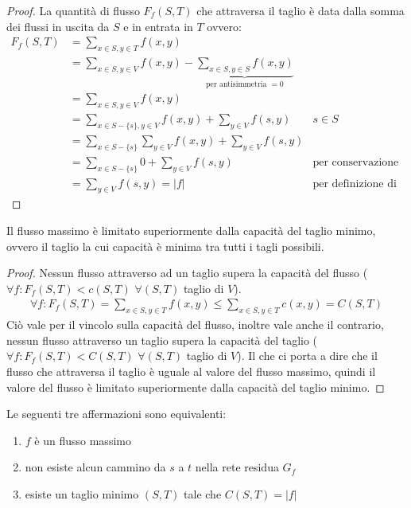         \begin{proof}
            La quantità di flusso $F_f(S,T)$ che attraversa il taglio è data dalla somma dei flussi in uscita da $S$ e in entrata in $T$ ovvero:
            \begin{align*}
                F_f(S,T) &= \sum_{x\in S,y\in T} f(x,y) \\
                &= \sum_{x\in S,y\in V} f(x,y) - \underbrace{\sum_{x\in S,y\in S} f(x,y)}_{\text{per antisimmetria }= 0} \\
                &= \sum_{x\in S,y\in V} f(x,y)\\
                &= \sum_{x\in S-\{s\},y\in V} f(x,y) + \sum_{y\in V} f(s,y) & s\in S \\
                &= \sum_{x\in S-\{s\}}\sum_{y\in V} f(x,y) + \sum_{y\in V} f(s,y) \\
                &= \sum_{x\in S-\{s\}} 0 + \sum_{y\in V} f(s,y) & \text{per conservazione } \\
                &= \sum_{y\in V} f(s,y) = |f| & \text{per definizione di flusso}
            \end{align*}
        \end{proof}
        \begin{theorem}
            Il flusso massimo è limitato superiormente dalla capacità del taglio minimo, ovvero il taglio la cui capacità è minima tra tutti i tagli possibili.
        \end{theorem}
        \begin{proof}
            Nessun flusso attraverso ad un taglio supera la capacità del flusso ($\forall f:F_f(S,T) < c(S,T)$ $\forall (S,T)$ taglio di $V$).
            \begin{align*}
                \forall f:F_f(S,T) = \sum_{x\in S,y\in T} f(x,y) \leq \sum_{x\in S,y\in T} c(x,y) = C(S,T) 
            \end{align*}
            Ciò vale per il vincolo sulla capacità del flusso, inoltre vale anche il contrario, nessun flusso attraverso un taglio supera la capacità del taglio ($\forall f:F_f(S,T) < C(S,T)$ $\forall (S,T)$ taglio di $V$). Il che ci porta a dire che il flusso che attraversa il taglio è uguale al valore del flusso massimo, quindi il valore del flusso è limitato superiormente dalla capacità del taglio minimo.
        \end{proof}
        \begin{theorem}
            Le seguenti tre affermazioni sono equivalenti:
            \begin{enumerate}
                \item $f$ è un flusso massimo
                \item non esiste alcun cammino da $s$ a $t$ nella rete residua $G_f$
                \item esiste un taglio minimo $(S,T)$ tale che $C(S,T) = |f|$
            \end{enumerate}
        \end{theorem}
